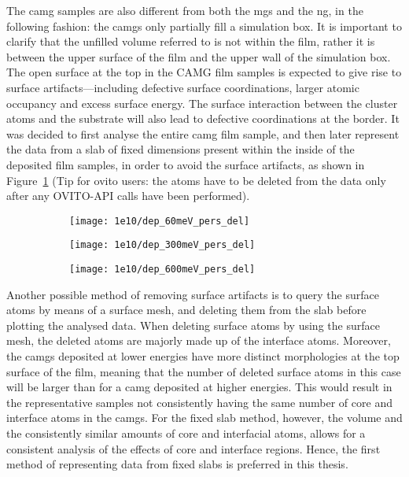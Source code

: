 \begin{changebar}
The \gls{camg} samples are also different from both the \gls{mg}s and the \gls{ng}, in the following fashion: the \gls{camg}s only partially fill a simulation box. It is important to clarify that the unfilled volume referred to is not within the film, rather it is between the upper surface of the film and the upper wall of the simulation box.  The open surface at the top in the CAMG film samples is expected to give rise to surface artifacts—including defective surface coordinations, larger atomic occupancy and excess surface energy. The surface interaction between the cluster atoms and the substrate will also lead to defective coordinations at the border. It was decided to first analyse the entire \gls{camg} film sample, and then later represent the data from a slab of fixed dimensions present within the inside of the deposited film samples, in order to avoid the surface artifacts, as shown in Figure~\ref{f:camg_slabs} (Tip for \gls{ovito} users: the atoms have to be deleted from the data only after any OVITO-API calls have been performed).  \par

\begin{figure}[h]
	\begin{subfigure}[b]{0.33\textwidth} \texttt{[image: 1e10/dep\_60meV\_pers\_del]}
		\caption{}
	\end{subfigure}%
	\hfill
	\begin{subfigure}[b]{0.33\textwidth} \texttt{[image: 1e10/dep\_300meV\_pers\_del]}
		\caption{}
	\end{subfigure}%
	\hfill
	\begin{subfigure}[b]{0.33\textwidth} \texttt{[image: 1e10/dep\_600meV\_pers\_del]}
		\caption{}
	\end{subfigure}%
	\label{f:camg_slabs}
\end{figure}
\end{changebar}

Another possible method of removing surface artifacts is to query the surface atoms by means of a surface mesh, and deleting them from the slab before plotting the analysed data. When deleting surface atoms by using the surface mesh, the deleted atoms are majorly made up of the interface atoms. Moreover, the \gls{camg}s deposited at lower energies have more distinct morphologies at the top surface of the film, meaning that the number of deleted surface atoms in this case will be larger than for a \gls{camg} deposited at higher energies. This would result in the representative samples not consistently having the same number of core and interface atoms in the \gls{camg}s. For the fixed slab method, however, the volume and the consistently similar amounts of core and interfacial atoms, allows for a consistent analysis of the effects of core and interface regions. Hence, the first method of representing data from fixed slabs is preferred in this thesis. \par

